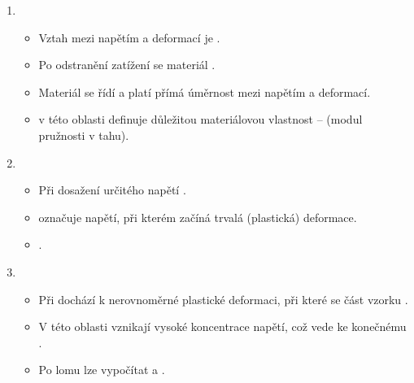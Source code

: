 \documentclass[letterpaper,10pt,english]{jupyterBook}
\begin{document}
\noindent{}
\begin{enumerate}
%
\item {} 
\sphinxAtStartPar
{}
\begin{itemize}
\item {} 
\sphinxAtStartPar
Vztah mezi napětím a deformací je .

\item {} 
\sphinxAtStartPar
Po odstranění zatížení se materiál .

\item {} 
\sphinxAtStartPar
Materiál se řídí  a platí přímá úměrnost mezi napětím a deformací.

\item {} 
\sphinxAtStartPar
{} v této oblasti definuje důležitou materiálovou vlastnost –  (modul pružnosti v tahu).

\end{itemize}

\item {} 
\sphinxAtStartPar
{}
\begin{itemize}
\item {} 
\sphinxAtStartPar
Při dosažení určitého napětí .

\item {} 
\sphinxAtStartPar
{} označuje napětí, při kterém začíná trvalá (plastická) deformace.

\item {} 
\sphinxAtStartPar
{}.

\end{itemize}

\item {} 
\sphinxAtStartPar
{}
\begin{itemize}
\item {} 
\sphinxAtStartPar
Při  dochází k nerovnoměrné plastické deformaci, při které se část vzorku .

\item {} 
\sphinxAtStartPar
V této oblasti vznikají vysoké koncentrace napětí, což vede ke konečnému .

\item {} 
\sphinxAtStartPar
Po lomu lze vypočítat  a .

\end{itemize}

\end{enumerate}
\end{document}
